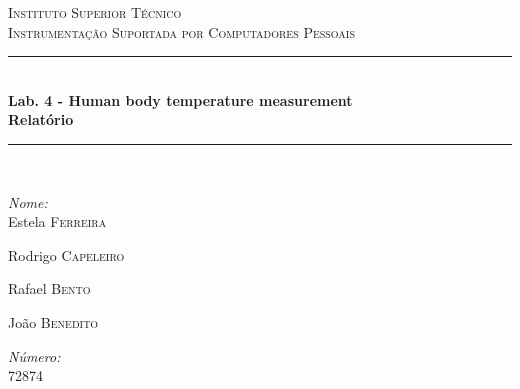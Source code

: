 
\begin{titlepage}


\newcommand{\HRule}{\rule{\linewidth}{0.5mm}} %

\center %
 \vspace*{4cm}

\textsc{\LARGE Instituto Superior Técnico}\\[1.5cm] %
\textsc{\Large Instrumentação Suportada por Computadores Pessoais}\\[0.5cm] %


\HRule \\[0.6cm]
{ \huge \bfseries
Lab. 4 - Human body temperature measurement}\\[0.40cm] %
{ \Large \bfseries Relatório}\\ %
\HRule \\[1.5cm]


\begin{minipage}{0.4\textwidth}
\begin{flushleft} \large
\emph{Nome:}\\
Estela \textsc{Ferreira} %

Rodrigo \textsc{Capeleiro}

Rafael \textsc{Bento}

João \textsc{Benedito}
\end{flushleft}
\end{minipage}
\begin{minipage}{0.4\textwidth}
\begin{flushright} \large
\emph{Número:} \\
72874


\end{flushright}
\end{minipage}
\end{titlepage}
